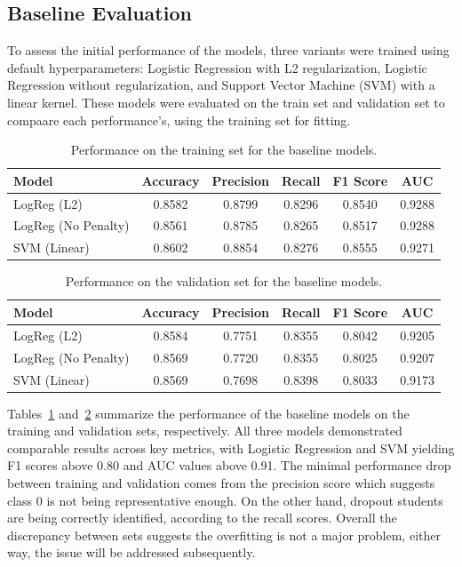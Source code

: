 \documentclass[runningheads]{llncs}
\begin{document}
\subsection{Baseline Evaluation}

To assess the initial performance of the models, three variants were trained using default hyperparameters: Logistic Regression with L2 regularization, Logistic Regression without regularization, and Support Vector Machine (SVM) with a linear kernel. These models were evaluated on the train set and validation set to compaare each performance's, using the training set for fitting. 

\begin{table}[H]
\centering
\caption{Performance on the training set for the baseline models.}
\label{tab:train_baseline}
\begin{tabular}{|l|c|c|c|c|c|}
\hline
\textbf{Model} & \textbf{Accuracy} & \textbf{Precision} & \textbf{Recall} & \textbf{F1 Score} & \textbf{AUC} \\
\hline
LogReg (L2) & 0.8582 & 0.8799 & 0.8296 & 0.8540 & 0.9288 \\
LogReg (No Penalty) & 0.8561 & 0.8785 & 0.8265 & 0.8517 & 0.9288 \\
SVM (Linear) & 0.8602 & 0.8854 & 0.8276 & 0.8555 & 0.9271 \\
\hline
\end{tabular}
\end{table}

\begin{table}[H]
\centering
\caption{Performance on the validation set for the baseline models.}
\label{tab:val_baseline}
\begin{tabular}{|l|c|c|c|c|c|}
\hline
\textbf{Model} & \textbf{Accuracy} & \textbf{Precision} & \textbf{Recall} & \textbf{F1 Score} & \textbf{AUC} \\
\hline
LogReg (L2) & 0.8584 & 0.7751 & 0.8355 & 0.8042 & 0.9205 \\
LogReg (No Penalty) & 0.8569 & 0.7720 & 0.8355 & 0.8025 & 0.9207 \\
SVM (Linear) & 0.8569 & 0.7698 & 0.8398 & 0.8033 & 0.9173 \\
\hline
\end{tabular}
\end{table}

 Tables~\ref{tab:train_baseline} and~\ref{tab:val_baseline} summarize the performance of the baseline models on the training and validation sets, respectively. All three models demonstrated comparable results across key metrics, with Logistic Regression and SVM yielding F1 scores above 0.80 and AUC values above 0.91. The minimal performance drop between training and validation comes from the precision score which suggests class 0 is not being representative enough. On the other hand, dropout students are being correctly identified, according to the recall scores. Overall the discrepancy between sets suggests the overfitting is not a major problem, either way, the issue will be addressed subsequently. 
\end{document}
